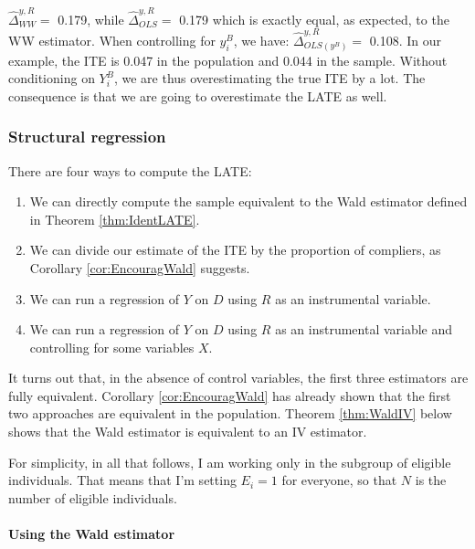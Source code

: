 \documentclass[]{book}
\providecommand{\tightlist}{%
  \setlength{\itemsep}{0pt}\setlength{\parskip}{0pt}}
\let\oldparagraph\paragraph
\renewcommand{\paragraph}[1]{\oldparagraph{#1}\mbox{}}
\theoremstyle{definition}
\theoremstyle{definition}
\theoremstyle{definition}
\theoremstyle{remark}
\begin{document}
\(\hat{\Delta}^{y,R}_{WW} =\) 0.179, while \(\hat{\Delta}^{y,R}_{OLS}=\) 0.179 which is exactly equal, as expected, to the WW estimator.
When controlling for \(y^B_i\), we have: \(\hat{\Delta}^{y,R}_{OLS(y^B)}=\) 0.108.
In our example, the ITE is 0.047 in the population and 0.044 in the sample.
Without conditioning on \(Y_i^B\), we are thus overestimating the true ITE by a lot.
The consequence is that we are going to overestimate the LATE as well.

\hypertarget{structural-regression}{%
\subsubsection{Structural regression}\label{structural-regression}}

There are four ways to compute the LATE:

\begin{enumerate}
\def\labelenumi{\arabic{enumi}.}
\tightlist
\item
  We can directly compute the sample equivalent to the Wald estimator defined in Theorem \ref{thm:IdentLATE}.
\item
  We can divide our estimate of the ITE by the proportion of compliers, as Corollary \ref{cor:EncouragWald} suggests.
\item
  We can run a regression of \(Y\) on \(D\) using \(R\) as an instrumental variable.
\item
  We can run a regression of \(Y\) on \(D\) using \(R\) as an instrumental variable and controlling for some variables \(X\).
\end{enumerate}

It turns out that, in the absence of control variables, the first three estimators are fully equivalent.
Corollary \ref{cor:EncouragWald} has already shown that the first two approaches are equivalent in the population.
Theorem \ref{thm:WaldIV} below shows that the Wald estimator is equivalent to an IV estimator.

For simplicity, in all that follows, I am working only in the subgroup of eligible individuals.
That means that I'm setting \(E_i=1\) for everyone, so that \(N\) is the number of eligible individuals.

\hypertarget{using-the-wald-estimator}{%
\paragraph{Using the Wald estimator}\label{using-the-wald-estimator}}
\end{document}

